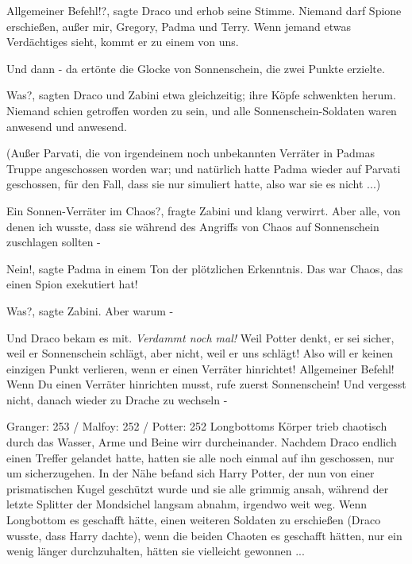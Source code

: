 \glqq{}Allgemeiner Befehl!?\grqq{}, sagte Draco und erhob seine Stimme. \glqq{}
Niemand darf Spione erschießen, außer mir, Gregory, Padma und Terry. Wenn jemand
etwas Verdächtiges sieht, kommt er zu einem von uns.\grqq{}

Und dann - da ertönte die Glocke von Sonnenschein, die zwei Punkte erzielte.

\glqq{}Was?\grqq{}, sagten Draco und Zabini etwa gleichzeitig; ihre Köpfe
schwenkten herum. Niemand schien getroffen worden zu sein, und alle
Sonnenschein-Soldaten waren anwesend und anwesend.

(Außer Parvati, die von irgendeinem noch unbekannten Verräter in Padmas Truppe
angeschossen worden war; und natürlich hatte Padma wieder auf Parvati
geschossen, für den Fall, dass sie nur simuliert hatte, also war sie es
nicht ...)

\glqq{}Ein Sonnen-Verräter im Chaos?\grqq{}, fragte Zabini und klang verwirrt.
\glqq{}Aber alle, von denen ich wusste, dass sie während des Angriffs von Chaos
auf Sonnenschein zuschlagen sollten -\grqq{}

\glqq{}Nein!\grqq{}, sagte Padma in einem Ton der plötzlichen Erkenntnis. \glqq{}
Das war Chaos, das einen Spion exekutiert hat!\grqq{}

\glqq{}Was?\grqq{}, sagte Zabini. \glqq{}Aber warum -\grqq{}

Und Draco bekam es mit.
\emph{Verdammt noch mal!}
\glqq{}Weil Potter denkt, er sei sicher, weil er Sonnenschein schlägt, aber
nicht, weil er uns schlägt! Also will er keinen einzigen Punkt verlieren, wenn
er einen Verräter hinrichtet! Allgemeiner Befehl! Wenn Du einen Verräter
hinrichten musst, rufe zuerst Sonnenschein! Und vergesst nicht, danach wieder zu
Drache zu wechseln -\grqq{}

Granger: 253 / Malfoy: 252 / Potter: 252 Longbottoms Körper trieb chaotisch
durch das Wasser, Arme und Beine wirr durcheinander. Nachdem Draco endlich einen
Treffer gelandet hatte, hatten sie alle noch einmal auf ihn geschossen, nur um
sicherzugehen. In der Nähe befand sich Harry Potter, der nun von einer
prismatischen Kugel geschützt wurde und sie alle grimmig ansah, während der
letzte Splitter der Mondsichel langsam abnahm, irgendwo weit weg. Wenn
Longbottom es geschafft hätte, einen weiteren Soldaten zu erschießen (Draco
wusste, dass Harry dachte), wenn die beiden Chaoten es geschafft hätten, nur ein
wenig länger durchzuhalten, hätten sie vielleicht gewonnen ...

